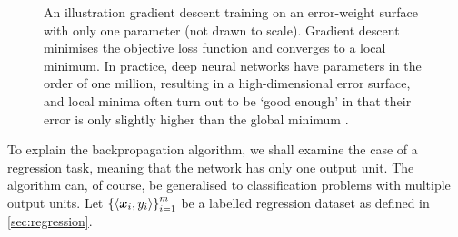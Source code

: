 \documentclass[../report.tex]{subfiles}
\begin{document}
\begin{figure}
    \centering
    \caption[An illustration gradient descent training on an error-weight surface.]{An illustration gradient descent training on an error-weight surface with only one parameter (not drawn to scale). Gradient descent minimises the objective loss function and converges to a local minimum. In practice, deep neural networks have parameters in the order of one million, resulting in a high-dimensional error surface, and local minima often turn out to be `good enough' in that their error is only slightly higher than the global minimum \cite{lecun2015}.}
    \label{fig:gradient_descent_local_minimum}
\end{figure}

To explain the backpropagation algorithm, we shall examine the case of a regression task, meaning that the network has only one output unit.
The algorithm can, of course, be generalised to classification problems with multiple output units.
Let $\left\{\langle {\bm{x}}_i, y_i \rangle \right\}_{i=1}^m$ be a labelled regression dataset as defined in \cref{sec:regression}.
\end{document}
